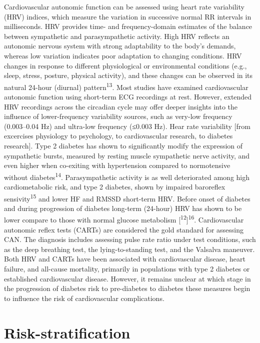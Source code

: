 \documentclass[
  a4paper,
  headsepline=true,
  open=any]{scrbook}
\begin{document}
Cardiovascular autonomic function can be assessed using heart rate
variability (HRV) indices, which measure the variation in successive
normal RR intervals in milliseconds. HRV provides time- and
frequency-domain estimates of the balance between sympathetic and
parasympathetic activity. High HRV reflects an autonomic nervous system
with strong adaptability to the body's demands, whereas low variation
indicates poor adaptation to changing conditions. HRV changes in
response to different physiological or environmental conditions (e.g.,
sleep, stress, posture, physical activity), and these changes can be
observed in its natural 24-hour (diurnal) pattern\textsuperscript{13}.
Most studies have examined cardiovascular autonomic function using
short-term ECG recordings at rest. However, extended HRV recordings
across the circadian cycle may offer deeper insights into the influence
of lower-frequency variability sources, such as very-low frequency
(0.003--0.04 Hz) and ultra-low frequency (≤0.003 Hz). Hear rate
variability {[}from excercises physiology to psychology, to
cardiovascular research, to diabetes research{]}. Type 2 diabetes has
shown to significantly modify the expression of sympathetic bursts,
measured by resting muscle sympathetic nerve activity, and even higher
when co-exiting with hypertension compared to normotensive without
diabetes\textsuperscript{14}. Parasympathetic activity is as well
deteriorated among high cardiometabolic risk, and type 2 diabetes, shown
by impaired baroreflex sensivity\textsuperscript{15} and lower HF and
RMSSD short-term HRV. Before onset of diabetes and during progression of
diabetes long-term (24-hour) HRV has shown to be lower compare to those
with normal glucose metabolism
{[}\textsuperscript{12}{]}\textsuperscript{16}. Cardiovascular autonomic
reflex tests (CARTs) are considered the gold standard for assessing CAN.
The diagnosis includes assessing pulse rate ratio under test conditions,
such as the deep breathing test, the lying-to-standing test, and the
Valsalva maneuver. Both HRV and CARTs have been associated with
cardiovascular disease, heart failure, and all-cause mortality,
primarily in populations with type 2 diabetes or established
cardiovascular disease. However, it remains unclear at which stage in
the progression of diabetes risk to pre-diabetes to diabetes these
measures begin to influence the risk of cardiovascular complications.

\hypertarget{risk-stratification}{%
\section{Risk-stratification}\label{risk-stratification}}
\end{document}
